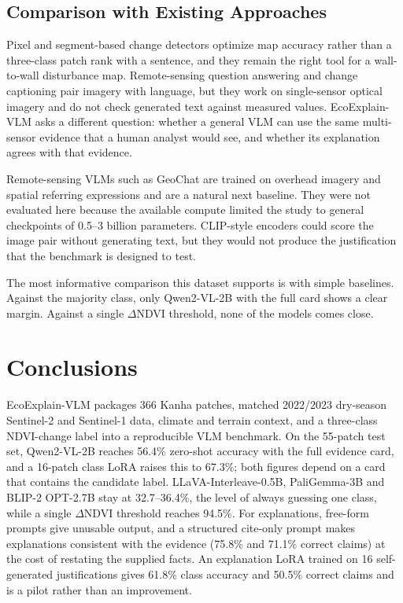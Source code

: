\documentclass[11pt]{article}
\begin{document}
\subsection{Comparison with Existing Approaches}

Pixel and segment-based change detectors optimize map accuracy
rather than a three-class patch rank with a sentence, and they remain
the right tool for a wall-to-wall disturbance map. Remote-sensing
question answering  and change captioning
 pair imagery with language, but they work on
single-sensor optical imagery and do not check generated text against
measured values. EcoExplain-VLM asks a different question: whether a
general VLM can use the same multi-sensor evidence that a human analyst
would see, and whether its explanation agrees with that evidence.

Remote-sensing VLMs such as GeoChat are trained on
overhead imagery and spatial referring expressions and are a natural
next baseline. They were not evaluated here because the available
compute limited the study to general checkpoints of 0.5--3 billion
parameters. CLIP-style encoders could score the
image pair without generating text, but they would not produce the
justification that the benchmark is designed to test.

The most informative comparison this dataset supports is with simple
baselines. Against the majority class, only Qwen2-VL-2B with the full
card shows a clear margin. Against a single $\Delta$NDVI threshold, none
of the models comes close.


\section{Conclusions}

EcoExplain-VLM packages 366 Kanha patches, matched 2022/2023 dry-season
Sentinel-2 and Sentinel-1 data, climate and terrain context, and a
three-class NDVI-change label into a reproducible VLM benchmark. On the
55-patch test set, Qwen2-VL-2B reaches 56.4\% zero-shot accuracy with
the full evidence card, and a 16-patch class LoRA raises this to
67.3\%; both figures depend on a card that contains the candidate label.
LLaVA-Interleave-0.5B, PaliGemma-3B and BLIP-2 OPT-2.7B stay at
32.7--36.4\%, the level of always guessing one class, while a single
$\Delta$NDVI threshold reaches 94.5\%. For explanations, free-form
prompts give unusable output, and a structured cite-only prompt makes
explanations consistent with the evidence (75.8\% and 71.1\% correct
claims) at the cost of restating the supplied facts. An explanation LoRA
trained on 16 self-generated justifications gives 61.8\% class accuracy
and 50.5\% correct claims and is a pilot rather than an improvement.
\end{document}
